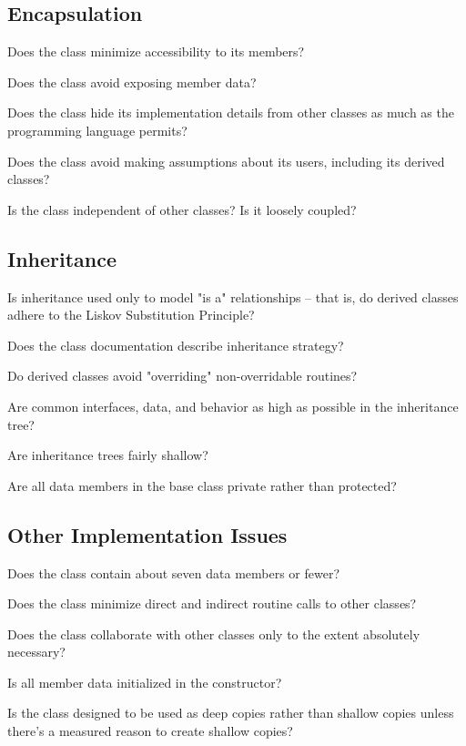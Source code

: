 \begin{multicols}{2}
\subsection*{Encapsulation}
\begin{todolist}
  \item Does the class minimize accessibility to its members?
  \item Does the class avoid exposing member data?
  \item Does the class hide its implementation details from other classes as much as the programming language permits?
  \item Does the class avoid making assumptions about its users, including its derived classes?
  \item Is the class independent of other classes? Is it loosely coupled?
\end{todolist}

\subsection*{Inheritance}
\begin{todolist}
  \item Is inheritance used only to model "is a" relationships -- that is, do derived classes adhere to the Liskov Substitution Principle?
  \item Does the class documentation describe inheritance strategy?
  \item Do derived classes avoid "overriding" non-overridable routines?
  \item Are common interfaces, data, and behavior as high as possible in the inheritance tree?
  \item Are inheritance trees fairly shallow?
  \item Are all data members in the base class private rather than protected?
\end{todolist}

\subsection*{Other Implementation Issues}
\begin{todolist}
  \item Does the class contain about seven data members or fewer?
  \item Does the class minimize direct and indirect routine calls to other classes?
  \item Does the class collaborate with other classes only to the extent absolutely necessary?
  \item Is all member data initialized in the constructor?
  \item Is the class designed to be used as deep copies rather than shallow copies unless there's a measured reason to create shallow copies?
\end{todolist}


\end{multicols}
